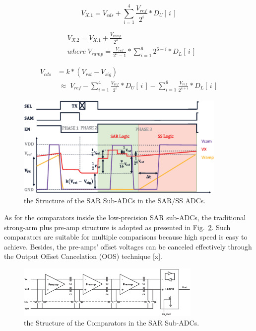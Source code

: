 \documentclass[conference]{IEEEtran}
\begin{document}
\begin{equation}
	V_{X.1}=V_{cds}+\sum_{i=1}^{4} {\frac{V_{ref}}{2^{i}}\ast{D_{U}\left[\,i\,\right]}}
	\label{eq4}
\end{equation}

\begin{equation}
	\begin{aligned}
	&V_{X.2}=V_{X.1}+\frac{V_{ramp}}{2^4}\\ &where\  V_{ramp}=\frac{V_{ref}}{2^6-1}\ast\sum_{i=1}^{6}2^{6-i}\ast{D_{L}\left[\,i\,\right]}
	\label{eq5}
	\end{aligned}	
\end{equation}

\begin{equation}
	\begin{aligned}
	V_{cds}&=k\ast(V_{rst}-V_{sig})\\
	&\;{\approx}\;{V_{ref}-\sum_{i=1}^{4} \frac{V_{ref}}{2^{i}}\ast{D_{U}\left[\,i\,\right]}-\sum_{i=1}^{6} \frac{V_{ref}}{2^{4+i}}\ast{D_{L}\left[\,i\,\right]}}
	\label{eq6}
	\end{aligned}
\end{equation}

\begin{figure}[htbp]
	\centerline{\includegraphics[width=4in]{./Figures/SARWAVE.eps}}
	\caption{the Structure of the SAR Sub-ADCs in the SAR/SS ADCs.}
	\label{SARWAVE}
\end{figure} 

As for the comparators inside the low-precision SAR sub-ADCs, the traditional strong-arm plus pre-amp structure is adopted as presented in Fig.~\ref{LATCH}. Such comparators 
are suitable for multiple comparisons because high speed is easy to achieve. Besides, the pre-amps’ offset voltages can be canceled effectively through the Output Offset Cancelation (OOS) technique [x].

\begin{figure}[htbp]
	\centerline{\includegraphics[width=3.5in]{./Figures/LATCH.eps}}
	\caption{the Structure of the Comparators in the SAR Sub-ADCs.}
	\label{LATCH}
\end{figure} 
\end{document}
